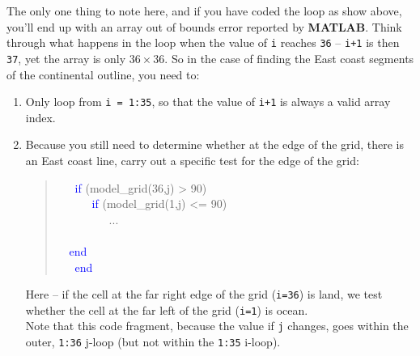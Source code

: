 \documentclass{tufte-book} %
\newenvironment{docspec}{\begin{quotation}\ttfamily\parskip0pt\parindent0pt\ignorespaces}{\end{quotation}}
\begin{document}
The only one thing to note here, and if you have coded the loop as show above, you'll end up with an array out of bounds error reported by \textbf{MATLAB}. Think through what happens in the loop when the value of \texttt{i} reaches \texttt{36} -- \texttt{i+1} is then \texttt{37}, yet the array is only \(36\times36\). So in the case of finding the East coast segments of the continental outline, you need to:

\begin{enumerate}[noitemsep]
\item Only loop from \texttt{i = 1:35}, so that the value of \texttt{i+1} is always a valid array index.
\item Because you still need to determine whether at the edge of the grid, there is an East coast line, carry out a specific test for the edge of  the grid:
\begin{docspec}
\ \ \ \textcolor{blue}{if} (model\_grid(36,j) > 90)\\
\ \ \ \ \ \ \textcolor{blue}{if} (model\_grid(1,j) <= 90)\\
\ \ \ \ \ \ \ \ \ ...\\
\ \ \ \ \\ \ \ \textcolor{blue}{end}\\
\ \ \ \textcolor{blue}{end}
\end{docspec}
Here -- if the cell at the far right edge of the grid (\texttt{i=36}) is land, we test whether the cell at the far left of the grid (\texttt{i=1}) is ocean.
\\\noindent Note that this code fragment, because the value if \texttt{j} changes, goes within the outer, \texttt{1:36} j-loop (but not within the \texttt{1:35} i-loop).
\end{enumerate}
\end{document}
